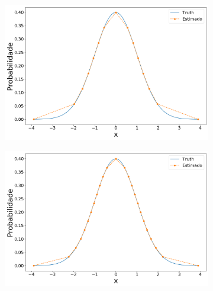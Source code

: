 \begin{figure}[H]
	\centering
	\begin{subfigure}[b]{0.45\textwidth}
		\centering 
		\includegraphics[width=\linewidth]{./figuras/PDFm_normal_15}
		\caption{}
		\label{fig:pdfnorm15}
	\end{subfigure}
	\hfill
	\begin{subfigure}[b]{0.45\textwidth}
		\centering 
		\includegraphics[width=\linewidth]{./figuras/PDFm_normal_25}
		\caption{}
		\label{fig:pdfnorm25}
	\end{subfigure}


\end{figure}

